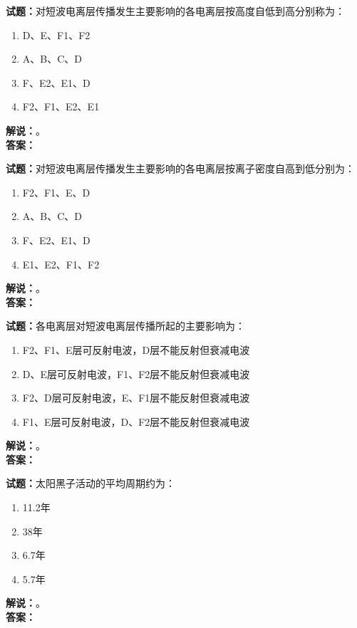 \documentclass{ctexbook}
\begin{document}
\bigskip

\noindent\textbf{试题：}对短波电离层传播发生主要影响的各电离层按高度自低到高分别称为：
\begin{enumerate}[leftmargin=3em]
  \item D、E、F1、F2
  \item A、B、C、D
  \item F、E2、E1、D
  \item F2、F1、E2、E1
\end{enumerate}
\noindent\textbf{解说：}\textbf{}。\\\noindent\textbf{答案：}

\bigskip

\noindent\textbf{试题：}对短波电离层传播发生主要影响的各电离层按离子密度自高到低分别为：
\begin{enumerate}[leftmargin=3em]
  \item F2、F1、E、D
  \item A、B、C、D
  \item F、E2、E1、D
  \item E1、E2、F1、F2
\end{enumerate}
\noindent\textbf{解说：}\textbf{}。\\\noindent\textbf{答案：}

\bigskip

\noindent\textbf{试题：}各电离层对短波电离层传播所起的主要影响为：
\begin{enumerate}[leftmargin=3em]
  \item F2、F1、E层可反射电波，D层不能反射但衰减电波
  \item D、E层可反射电波，F1、F2层不能反射但衰减电波
  \item F2、D层可反射电波，E、F1层不能反射但衰减电波
  \item F1、E层可反射电波，D、F2层不能反射但衰减电波
\end{enumerate}
\noindent\textbf{解说：}\textbf{}。\\\noindent\textbf{答案：}

\bigskip

\noindent\textbf{试题：}太阳黑子活动的平均周期约为：
\begin{enumerate}[leftmargin=3em]
  \item 11.2年
  \item 38年
  \item 6.7年
  \item 5.7年
\end{enumerate}
\noindent\textbf{解说：}\textbf{}。\\\noindent\textbf{答案：}
\end{document}
